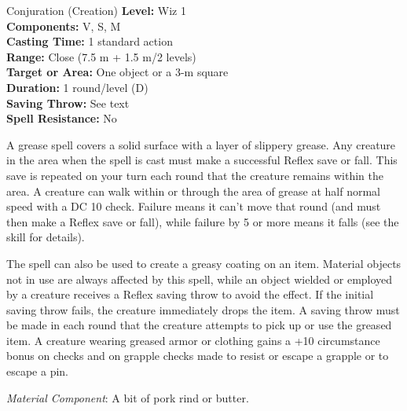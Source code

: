{Conjuration (Creation)}
{
	\textbf{Level:}
	Wiz 1\\
	\textbf{Components:}
	V, S, M\\
	\textbf{Casting Time:}
	1 standard action\\
	\textbf{Range:}
	Close (7.5 m + 1.5 m/2 levels)\\
	\textbf{Target or Area:}
	One object or a 3-m square\\
	\textbf{Duration:}
	1 round/level (D)\\
	\textbf{Saving Throw:}
	See text\\
	\textbf{Spell Resistance:}
	No\\
}
{
	A grease spell covers a solid surface with a layer of slippery grease. Any creature in the area when the spell is cast must make a successful Reflex save or fall. This save is repeated on your turn each round that the creature remains within the area. A creature can walk within or through the area of grease at half normal speed with a DC 10  check. Failure means it can't move that round (and must then make a Reflex save or fall), while failure by 5 or more means it falls (see the  skill for details).

	The spell can also be used to create a greasy coating on an item. Material objects not in use are always affected by this spell, while an object wielded or employed by a creature receives a Reflex saving throw to avoid the effect. If the initial saving throw fails, the creature immediately drops the item. A saving throw must be made in each round that the creature attempts to pick up or use the greased item. A creature wearing greased armor or clothing gains a +10 circumstance bonus on  checks and on grapple checks made to resist or escape a grapple or to escape a pin.

	\textit{Material Component}:
	A bit of pork rind or butter.

}
